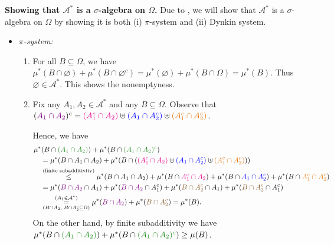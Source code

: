 \begin{enumerate}
\begin{pf}
\textbf{Showing that \(\mathcal{A}^*\) is a \(\sigma\)-algebra on
\(\Omega\).} Due to , we will show that
\(\mathcal{A}^*\) is a \(\sigma\)-algebra on \(\Omega\) by showing it is
both (i) \(\pi\)-system and (ii) Dynkin system.

\begin{itemize}
\item \emph{\(\pi\)-system:}
\begin{enumerate}[label={(\arabic*)}]
\item For all \(B\subseteq \Omega\), we have
\(\mu^*(B\cap\varnothing)+\mu^*(B\cap\varnothing^c)
=\mu^*(\varnothing)+\mu^*(B\cap\Omega)=\mu^*(B)\). Thus
\(\varnothing\in\mathcal{A}^*\). This shows the nonemptyness.
\item Fix any \(A_1,A_2\in\mathcal{A}^*\) and any \(B\subseteq \Omega\).
Observe that \((\vc{A_1\cap A_2})^c
=\mgc{(A_1^c\cap A_2)}\uplus \blc{(A_1\cap A_2^c)}\uplus \orc{(A_1^c\cap A_2^c)}
\).
\begin{center}
\end{center}
Hence, we have
\begin{align*}
&\mu^*(B\cap\gc{(A_1\cap A_2)})+\mu^*(B\cap\gc{(A_1\cap A_2)^{c}}) \\
&\quad=\mu^*(B\cap A_1\cap A_2)
+\mu^*(B\cap(\mgc{(A_1^c\cap A_2)}\uplus \blc{(A_1\cap A_2^c)}\uplus \orc{(A_1^c\cap A_2^c)})) \\
&\quad\overset{\text{(finite subadditivity)}}{\le}
\mu^*(B\cap A_1\cap A_2)
+\mu^*(B\cap\mgc{A_1^c\cap A_2})
+\mu^*(B\cap\blc{A_1\cap A_2^c})
+\mu^*(B\cap\orc{A_1^c\cap A_2^c}) \\
&\quad=\mu^*(\vc{B\cap A_2}\cap A_1)
+\mu^*(\vc{B\cap A_2}\cap A_1^c)
+\mu^*(\brc{B\cap A_2^c}\cap A_1)
+\mu^*(\brc{B\cap A_2^c}\cap A_1^c) \\
&\quad\underset{(B\cap A_2,\; B\cap A_2^c\subseteq \Omega)}{\overset{(A_1\in\mathcal{A}^*)}{=}}
\mu^*(\vc{B\cap A_2})+\mu^*(\brc{B\cap A_2^c})
=\mu^*(B).
\end{align*}
On the other hand, by finite subadditivity we have
\(\mu^*(B\cap\gc{(A_1\cap A_2)})+\mu^*(B\cap\gc{(A_1\cap A_2)^{c}})\ge
\mu(B)\).

\end{enumerate}
\end{itemize}
\end{pf}
\end{enumerate}
